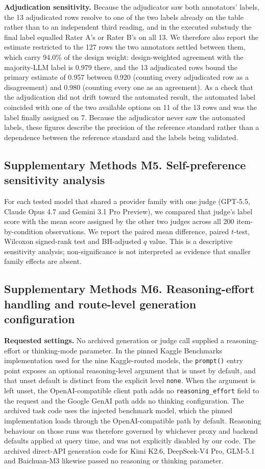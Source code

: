 \documentclass[10pt]{article}
\begin{document}
\textbf{Adjudication sensitivity.} Because the adjudicator saw both annotators' labels,
the 13 adjudicated rows resolve to one of the two labels already on the table rather than
to an independent third reading, and in the executed substudy the final label equalled
Rater A's or Rater B's on all 13. We therefore also report the estimate restricted to the
127 rows the two annotators settled between them, which carry 94.0\% of the design weight:
design-weighted agreement with the majority-LLM label is 0.979 there, and the 13
adjudicated rows bound the primary estimate of 0.957 between 0.920 (counting every
adjudicated row as a disagreement) and 0.980 (counting every one as an agreement). As a
check that the adjudication did not drift toward the automated result, the automated label
coincided with one of the two available options on 11 of the 13 rows and was the label
finally assigned on 7. Because the adjudicator never saw the automated labels, these
figures describe the precision of the reference standard rather than a dependence between
the reference standard and the labels being validated.

\subsection*{Supplementary Methods M5. Self-preference sensitivity analysis}
For each tested model that shared a provider family with one judge (GPT-5.5, Claude
Opus 4.7 and Gemini 3.1 Pro Preview), we compared that judge's label score with the
mean score assigned by the other two judges across all 200 item-by-condition
observations. We report the paired mean difference, paired $t$-test, Wilcoxon
signed-rank test and BH-adjusted $q$ value. This is a descriptive sensitivity analysis;
non-significance is not interpreted as evidence that smaller family effects are absent.

\subsection*{Supplementary Methods M6. Reasoning-effort handling and route-level generation configuration}

\textbf{Requested settings.} No archived generation or judge call supplied a
reasoning-effort or thinking-mode parameter. In the pinned Kaggle Benchmarks
implementation used for the nine Kaggle-routed models, the \texttt{prompt()} entry point
exposes an optional reasoning-level argument that is unset by default, and that unset
default is distinct from the explicit level \texttt{none}. When the argument is left
unset, the OpenAI-compatible client path adds no \texttt{reasoning\_effort} field to the
request and the Google GenAI path adds no thinking configuration. The archived task code
uses the injected benchmark model, which the pinned implementation loads through the
OpenAI-compatible path by default. Reasoning behaviour on those runs was therefore
governed by whichever proxy and backend defaults applied at query time, and was not
explicitly disabled by our code. The archived direct-API generation code for Kimi K2.6,
DeepSeek-V4 Pro, GLM-5.1 and Baichuan-M3 likewise passed no reasoning or thinking
parameter.
\end{document}
